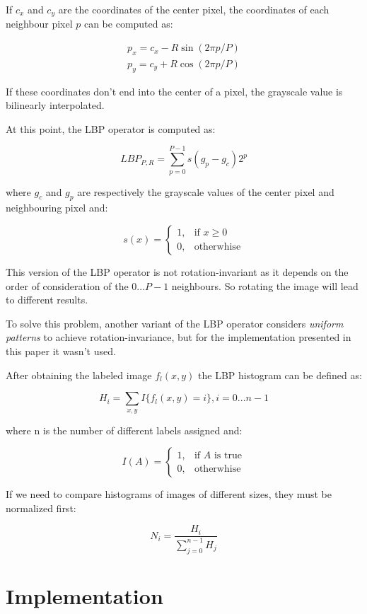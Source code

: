 \documentclass[10pt,twocolumn,letterpaper]{article}
\begin{document}
If $c_x$ and $c_y$ are the coordinates of the center pixel, the coordinates of each neighbour pixel $p$ can be computed as:

\begin{gather*}
	p_x = c_x - R\sin(2\pi p/P) \\ 
	p_y = c_y + R\cos(2\pi p/P)
\end{gather*}

If these coordinates don't end into the center of a pixel, the grayscale value is bilinearly interpolated.

At this point, the LBP operator is computed as:

\[LBP_{P, R} = \sum_{p = 0}^{P - 1}s(g_p - g_c)2^p\]

where $g_c$ and $g_p$ are respectively the grayscale values of the center pixel and neighbouring pixel and:

\[s(x) = \begin{cases} 1, & \mbox{if } x \ge 0 \\ 0, & \mbox{otherwhise} \end{cases}\]

This version of the LBP operator is not rotation-invariant as it depends on the order of consideration of the $0...P-1$ neighbours. So rotating the image will lead to different results.

To solve this problem, another variant of the LBP operator considers \textit{uniform patterns} to achieve rotation-invariance, but for the implementation presented in this paper it wasn't used.

After obtaining the labeled image $f_l(x, y)$ the LBP histogram can be defined as:

\[H_i = \sum_{x, y}I\{f_l(x, y) = i\}, i = 0...n -1\]

where n is the number of different labels assigned and:

\[I(A) = \begin{cases} 1, & \mbox{if } A \mbox{ is true} \\ 0, & \mbox{otherwhise} \end{cases}\]

If we need to compare histograms of images of different sizes, they must be normalized first:

\[N_i = \frac{H_i}{\sum_{j = 0}^{n - 1}H_j}\]

\section{Implementation}
\end{document}
